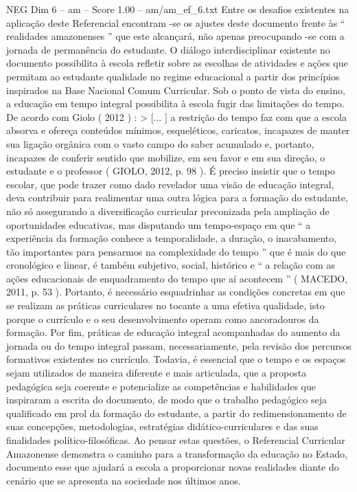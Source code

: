 \begin{textsample}{NEG Dim 6 – am – Score 1.00 – am/am\_ef\_6.txt}
Entre os desafios existentes na aplicação deste Referencial encontram -se os ajustes deste documento frente às “ realidades amazonenses ” que este alcançará, não apenas preocupando -se com a jornada de permanência do estudante.
O diálogo interdisciplinar existente no documento possibilita à escola refletir sobre as escolhas de atividades e ações que permitam ao estudante qualidade no regime educacional a partir dos princípios inspirados na Base Nacional Comum Curricular.
Sob o ponto de vista do ensino, a educação em tempo integral possibilita à escola fugir das limitações do tempo.
De acordo com Giolo ( 2012 ) : > [... ] a restrição do tempo faz com que a escola absorva e ofereça conteúdos mínimos, esqueléticos, caricatos, incapazes de manter sua ligação orgânica com o vasto campo do saber acumulado e, portanto, incapazes de conferir sentido que mobilize, em seu favor e em sua direção, o estudante e o professor ( GIOLO, 2012, p. 98 ).
É preciso insistir que o tempo escolar, que pode trazer como dado revelador uma visão de educação integral, deva contribuir para realimentar uma outra lógica para a formação do estudante, não só assegurando a diversificação curricular preconizada pela ampliação de oportunidades educativas, mas disputando um tempo-espaço em que “ a experiência da formação conhece a temporalidade, a duração, o inacabamento, tão importantes para pensarmos na complexidade do tempo ” que é mais do que cronológico e linear, é também subjetivo, social, histórico e “ a relação com as ações educacionais de enquadramento do tempo que aí acontecem ” ( MACEDO, 2011, p. 53 ).
Portanto, é necessário esquadrinhar as condições concretas em que se realizam as práticas curriculares no tocante a uma efetiva qualidade, isto porque o currículo e o seu desenvolvimento operam como ancoradouros da formação.
Por fim, práticas de educação integral acompanhadas do aumento da jornada ou do tempo integral passam, necessariamente, pela revisão dos percursos formativos existentes no currículo.
Todavia, é essencial que o tempo e os espaços sejam utilizados de maneira diferente e mais articulada, que a proposta pedagógica seja coerente e potencialize as competências e habilidades que inspiraram a escrita do documento, de modo que o trabalho pedagógico seja qualificado em prol da formação do estudante, a partir do redimensionamento de suas concepções, metodologias, estratégias didático-curriculares e das suas finalidades político-filosóficas.
Ao pensar estas questões, o Referencial Curricular Amazonense demonstra o caminho para a transformação da educação no Estado, documento esse que ajudará a escola a proporcionar novas realidades diante do cenário que se apresenta na sociedade nos últimos anos.

\end{textsample}
